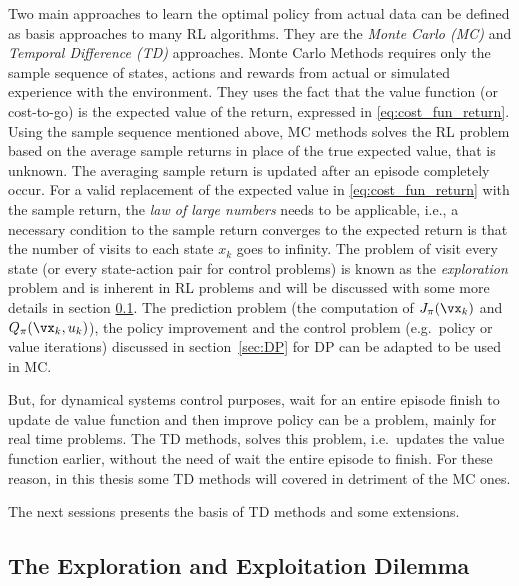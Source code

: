 Two main approaches to learn the optimal policy from actual data can be defined as basis approaches to many RL algorithms.
They are the \textit{Monte Carlo (MC)} and  \textit{Temporal Difference (TD)} approaches.
Monte Carlo Methods requires only the sample sequence of states, actions and rewards from actual or simulated experience with the environment.
They uses the fact  that the value function (or cost-to-go) is the expected value of the return, expressed in \eqref{eq:cost_fun_return}. 
Using the sample sequence mentioned above, MC methods solves the RL problem based on the average sample returns in place of the true expected value, that is unknown.
The averaging sample return is updated after an episode completely occur.
For a valid replacement of the expected value in \eqref{eq:cost_fun_return} with the sample return, the \textit{law of large numbers} needs to be applicable, i.e., a necessary condition to the sample return converges to the expected return is that the number of visits to each state $x_k$ goes to infinity. 
The problem of visit every state (or every state-action pair for control problems) is known as the \textit{exploration} problem and is inherent in RL problems and will be discussed with some more details in section \ref{sec:expandexp}.
The prediction problem (the computation of $J_\pi(\vx_k)$ and $Q_\pi(\vx_k,u_k)$), the policy improvement and the control problem (e.g.\ policy or value iterations) discussed in section~\ref{sec:DP} for DP can be adapted to be used in MC.

But, for dynamical systems control purposes, wait for an entire episode finish to update de value function and then improve policy can be a problem, mainly for real time problems.
The TD methods, solves this problem, i.e.\ updates the value function earlier, without the need of wait the entire episode to finish.
For these reason, in this thesis some TD methods will covered in detriment of the MC ones.

The next sessions presents the basis of TD methods and some extensions. 


\subsection{The Exploration and Exploitation Dilemma}
\label{sec:expandexp}

